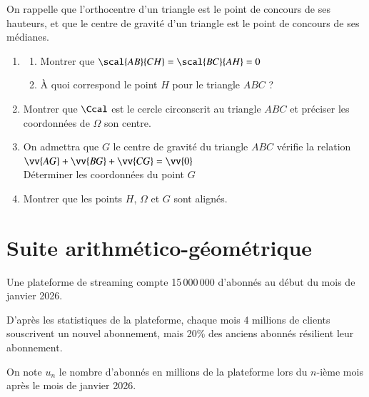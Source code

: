 \documentclass[oneside,12pt]{article}
\begin{document}
On rappelle que l'orthocentre d'un triangle est le point de concours de ses hauteurs, et que le centre de gravité d'un triangle est le point de concours de ses médianes.
\begin{enumerate}
	\item \begin{enumerate}
		\item Montrer que $\scal{AB}{CH}=\scal{BC}{AH}=0$
		\item À quoi correspond le point $H$ pour le triangle $ABC$ ?
	\end{enumerate}
	\item Montrer que $\Ccal$ est le cercle circonscrit au triangle $ABC$ et préciser les coordonnées de $\Omega$ son centre.
	\item On admettra que $G$ le centre de gravité du triangle $ABC$ vérifie la relation $\vv{AG}+\vv{BG}+\vv{CG}=\vv{0}$ \\
	Déterminer les coordonnées du point $G$
	\item Montrer que les points $H$, $\Omega$ et $G$ sont alignés.
\end{enumerate}

\newpage

\section{Suite arithmético-géométrique}
Une plateforme de streaming compte 15\,000\,000 d'abonnés au début du mois de janvier 2026.

D'après les statistiques de la plateforme, chaque mois 4 millions de clients souscrivent un nouvel abonnement, mais 20\% des anciens abonnés résilient leur abonnement.

On note $u_n$ le nombre d'abonnés en millions de la plateforme lors du $n$-ième mois après le mois de janvier 2026.
\end{document}
